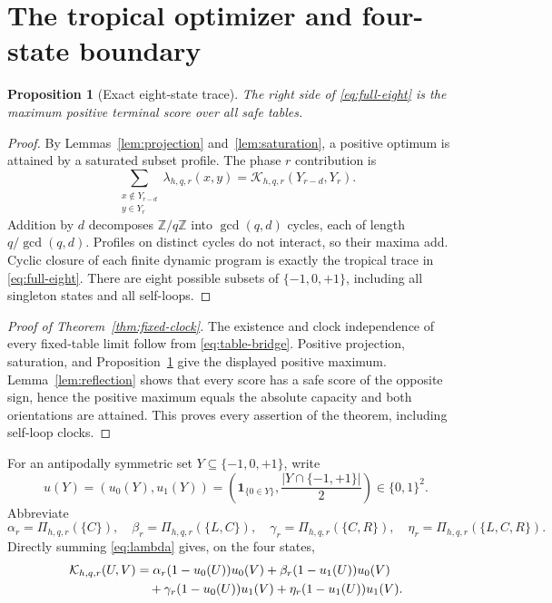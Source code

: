 \documentclass[11pt]{article}
\newtheorem{proposition}[theorem]{Proposition}
\theoremstyle{definition}
\theoremstyle{remark}
\newcommand{\ind}{\mathbf 1}
\newcommand{\T}{\{-1,0,+1\}}
\newcommand{\Z}{\mathbb Z}
\begin{document}
\section{The tropical optimizer and four-state boundary}

\begin{proposition}[Exact eight-state trace]
\label{prop:tropical}
The right side of \eqref{eq:full-eight} is the maximum positive terminal
score over all safe tables.
\end{proposition}

\begin{proof}
By Lemmas~\ref{lem:projection} and~\ref{lem:saturation}, a positive
optimum is attained by a saturated subset profile.  The phase \(r\)
contribution is
\[
 \sum_{\substack{x\notin Y_{r-d}\\y\in Y_r}}
 \lambda_{h,q,r}(x,y)
 =\mathcal K_{h,q,r}(Y_{r-d},Y_r).
\]
Addition by \(d\) decomposes \(\Z/q\Z\) into \(\gcd(q,d)\) cycles, each
of length \(q/\gcd(q,d)\).  Profiles on distinct cycles do not interact,
so their maxima add.  Cyclic closure of each finite dynamic program is
exactly the tropical trace in \eqref{eq:full-eight}.  There are eight
possible subsets of \(\T\), including all singleton states and all
self-loops.
\end{proof}

\begin{proof}[Proof of Theorem~\ref{thm:fixed-clock}]
The existence and clock independence of every fixed-table limit follow
from \eqref{eq:table-bridge}.  Positive projection, saturation, and
Proposition~\ref{prop:tropical} give the displayed positive maximum.
Lemma~\ref{lem:reflection} shows that every score has a safe score of the
opposite sign, hence the positive maximum equals the absolute capacity
and both orientations are attained.  This proves every assertion of the
theorem, including self-loop clocks.
\end{proof}

For an antipodally symmetric set \(Y\subseteq\T\), write
\[
 u(Y)=\left(u_0(Y),u_1(Y)\right)
 =\left(\ind_{\{0\in Y\}},
 \frac{|Y\cap\{-1,+1\}|}{2}\right)\in\{0,1\}^2.
\]
Abbreviate
\[
 \alpha_r=\Pi_{h,q,r}(\{C\}),\quad
 \beta_r=\Pi_{h,q,r}(\{L,C\}),\quad
 \gamma_r=\Pi_{h,q,r}(\{C,R\}),\quad
 \eta_r=\Pi_{h,q,r}(\{L,C,R\}).
\]
Directly summing \eqref{eq:lambda} gives, on the four states,
\begin{align}
 \mathcal K_{h,q,r}(U,V)
 &=\alpha_r(1-u_0(U))u_0(V)
 +\beta_r(1-u_1(U))u_0(V)\notag\\
 &\quad+\gamma_r(1-u_0(U))u_1(V)
 +\eta_r(1-u_1(U))u_1(V).
 \label{eq:four-transition}
\end{align}
\end{document}

